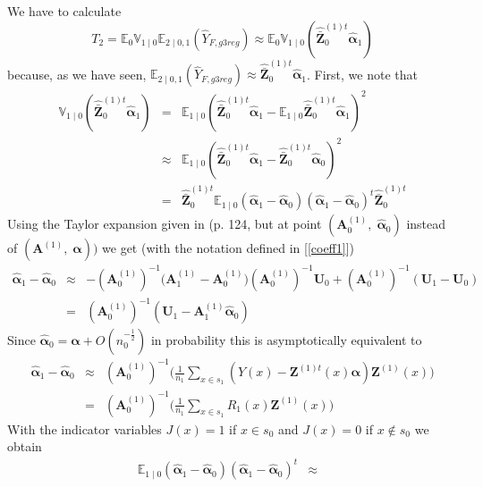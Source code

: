 \documentclass[a4paper,12pt,leqno, titlepage]{article}
\newcommand{\EX}{\mathbb{E}}
\newcommand{\VAR}{\mathbb{V}}
\begin{document}
\begin{appendix}
We have to calculate
\begin{equation*}
T_2=\EX_0\VAR_{1 \mid 0}\EX_{2\mid 0,1}(\hat{Y}_{F,g3reg})\approx \EX_0\VAR_{1 \mid 0}(\hat{\bar{\pmb{Z}}}_0^{(1)t}\hat{\pmb{\alpha}}_1)
\end{equation*}
because, as we have seen, $\EX_{2\mid 0,1}(\hat{Y}_{F,g3reg})\approx \hat{\bar{\pmb{Z}}}^{(1)t}_0\hat{\pmb{\alpha}}_1$.
 First, we note that
\begin{eqnarray*}
 \VAR_{1 \mid 0}(\hat{\bar{\pmb{Z}}}_0^{(1)t}\hat{\pmb{\alpha}}_1)&=&
\EX_{ 1\mid 0}(\hat{\bar{\pmb{Z}}}_0^{(1)t}\hat{\pmb{\alpha}}_1-\EX_{1 \mid 0}\hat{\bar{\pmb{Z}}}_0^{(1)t}\hat{\pmb{\alpha}}_1)^2 \nonumber\\
& \approx & \EX_{1 \mid 0}(\hat{\bar{\pmb{Z}}}_0^{(1)t}\hat{\pmb{\alpha}}_1-\hat{\bar{\pmb{Z}}}_0^{(1)t}\hat{\pmb{\alpha}}_0)^2 \nonumber \\
&=& \hat{\bar{\pmb{Z}}}_0^{(1)t}\EX_{1 \mid 0}(\hat{\pmb{\alpha}}_1-\hat{\pmb{\alpha}}_0)(\hat{\pmb{\alpha}}_1-\hat{\pmb{\alpha}}_0)^t\hat{\bar{\pmb{Z}}}_0^{(1)t}
\end{eqnarray*}
\noindent Using the Taylor expansion given in \cite{mandallaz} (p. 124, but at point $(\pmb{A}^{(1)}_0,\;\hat{\pmb{\alpha}}_0)$ instead of $(\pmb{A}^{(1)},\;\pmb{\alpha}))$ we get (with the notation defined in [\ref{coeff1}])
\begin{eqnarray*}
\hat{\pmb{\alpha}}_1-\hat{\pmb{\alpha}}_0 &\approx &
-(\pmb{A}^{(1)}_0)^{-1}\big(\pmb{A}^{(1)}_1-\pmb{A}^{(1)}_0\big)(\pmb{A}^{(1)}_0)^{-1}\pmb{U}_0+
(\pmb{A}^{(1)}_0)^{-1}(\pmb{U}_1-\pmb{U}_0) \nonumber \\
&=& (\pmb{A}^{(1)}_0)^{-1}(\pmb{U}_1-\pmb{A}^{(1)}_1\hat{\pmb{\alpha}}_0)
\end{eqnarray*}
Since $\hat{\pmb{\alpha}}_0=\pmb{\alpha} + O(n_0^{-\frac{1}{2}})$ in probability this is asymptotically equivalent
to
\begin{eqnarray}\label{tayloralpha0}
\hat{\pmb{\alpha}}_1-\hat{\pmb{\alpha}}_0 & \approx &
(\pmb{A}^{(1)}_0)^{-1}\Big(\frac{1}{n_1}\sum_{x\in{s_1}}(Y(x)-\pmb{Z}^{(1)t}(x)\pmb{\alpha})\pmb{Z}^{(1)}(x)\Big)\nonumber \\
&=&(\pmb{A}^{(1)}_0)^{-1}\Big(\frac{1}{n_1}\sum_{x\in{s_1}}R_1(x)\pmb{Z}^{(1)}(x)\Big)
\end{eqnarray}
With the indicator variables $J(x)=1$ if $x\in{s_0}$ and $J(x)=0$ if $x\not\in{s_0}$ we obtain
\begin{eqnarray*}
\EX_{1 \mid 0}(\hat{\pmb{\alpha}}_1-\hat{\pmb{\alpha}}_0 )(\hat{\pmb{\alpha}}_1-\hat{\pmb{\alpha}}_0)^t & \approx &

\end{eqnarray*}
\end{appendix}
\end{document}
